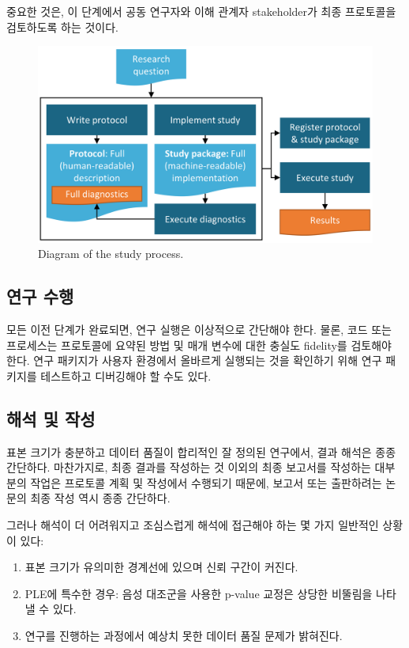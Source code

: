 \documentclass[10.5pt]{book}
\theoremstyle{definition}
\theoremstyle{definition}
\theoremstyle{definition}
\theoremstyle{remark}
\begin{document}
중요한 것은, 이 단계에서 공동 연구자와 이해 관계자 stakeholder가 최종
프로토콜을 검토하도록 하는 것이다.

\begin{figure}

{\centering \includegraphics[width=0.9\linewidth]{images/StudySteps/studyProcess} 

}

\caption{Diagram of the study process.}\label{fig:studyProcess}
\end{figure}

\subsection{연구 수행}\label{-}

모든 이전 단계가 완료되면, 연구 실행은 이상적으로 간단해야 한다. 물론,
코드 또는 프로세스는 프로토콜에 요약된 방법 및 매개 변수에 대한 충실도
fidelity를 검토해야 한다. 연구 패키지가 사용자 환경에서 올바르게
실행되는 것을 확인하기 위해 연구 패키지를 테스트하고 디버깅해야 할 수도
있다.

\subsection{해석 및 작성}\label{--}

표본 크기가 충분하고 데이터 품질이 합리적인 잘 정의된 연구에서, 결과
해석은 종종 간단하다. 마찬가지로, 최종 결과를 작성하는 것 이외의 최종
보고서를 작성하는 대부분의 작업은 프로토콜 계획 및 작성에서 수행되기
때문에, 보고서 또는 출판하려는 논문의 최종 작성 역시 종종 간단하다.

그러나 해석이 더 어려워지고 조심스럽게 해석에 접근해야 하는 몇 가지
일반적인 상황이 있다:

\begin{enumerate}
\def\labelenumi{\arabic{enumi}.}
\item
  표본 크기가 유의미한 경계선에 있으며 신뢰 구간이 커진다.
\item
  PLE에 특수한 경우: 음성 대조군을 사용한 p-value 교정은 상당한 비뚤림을
  나타낼 수 있다.
\item
  연구를 진행하는 과정에서 예상치 못한 데이터 품질 문제가 밝혀진다.
\end{enumerate}
\end{document}
